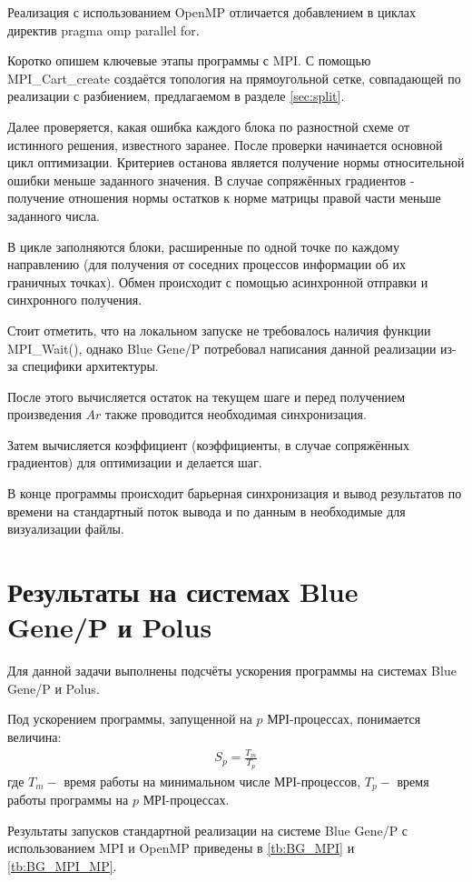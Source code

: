 \documentclass[12pt, fleqn]{article}
\theoremstyle{definition}
\begin{document}
Реализация с использованием OpenMP отличается добавлением в циклах директив pragma omp parallel for.

Коротко опишем ключевые этапы программы с MPI. С помощью MPI\_Ca\-rt\_cre\-ate создаётся топология на прямоугольной сетке, совпадающей по реализации с разбиением, предлагаемом в разделе \ref{sec:split}.  

Далее проверяется, какая ошибка каждого блока по разностной схеме от истинного решения, известного заранее. После проверки начинается основной цикл оптимизации. Критериев останова является получение нормы относительной ошибки меньше заданного значения. В случае сопряжённых градиентов - получение отношения нормы остатков к норме матрицы правой части меньше заданного числа.

В цикле заполняются блоки, расширенные по одной точке по каждому направлению (для получения от соседних процессов информации об их граничных точках). Обмен происходит с помощью асинхронной отправки и синхронного получения.

Стоит отметить, что на локальном запуске не требовалось наличия функции MPI\_Wait(), однако Blue Gene/P потребовал написания данной реализации из-за специфики архитектуры. 

После этого вычисляется остаток на текущем шаге и перед получением произведения $Ar$ также проводится необходимая синхронизация. 

Затем вычисляется коэффициент (коэффициенты, в случае сопряжённых градиентов) для оптимизации и делается шаг.

В конце программы происходит барьерная синхронизация и вывод результатов по времени на стандартный поток вывода и по данным в необходимые для визуализации файлы.
\section{Результаты на системах Blue Gene/P и Polus}
Для данной задачи выполнены подсчёты ускорения программы на системах Blue Gene/P и Polus.

Под ускорением программы, запущенной на $p$ МРІ-процессах, понимается величина:
\abovedisplayskip=-1pt
\belowdisplayskip=-1pt
\noindent
\begin{gather*}
S_{p}=\frac{T_{m}}{T_{p}}
\end{gather*}
где $T_{m}-$ время работы на минимальном числе МРІ-процессов, $T_{p}-$ время работы программы на $p$ МРІ-процессах.  

Результаты запусков стандартной реализации на системе Blue Gene/P с использованием MPI и OpenMP приведены в \ref{tb:BG_MPI} и \ref{tb:BG_MPI_MP}. 
\end{document}

